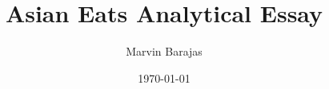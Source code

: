 \documentclass[12pt]{article}
\title{Asian Eats Analytical Essay}
\author{Marvin Barajas}
\date{\today}				%
\begin{document}
\doublespacing                         	%
\maketitle                              %
\pagebreak


\end{document}
